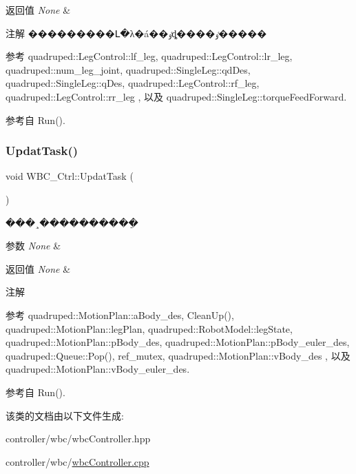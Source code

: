 \begin{DoxyRetVals}{返回值}
{\em None} & \\
\hline
\end{DoxyRetVals}
\begin{DoxyNote}{注解}
���������Լ�λ�á��ٶȡ����ٶ����� 
\end{DoxyNote}


参考 quadruped\+::\+Leg\+Control\+::lf\+\_\+leg, quadruped\+::\+Leg\+Control\+::lr\+\_\+leg, quadruped\+::num\+\_\+leg\+\_\+joint, quadruped\+::\+Single\+Leg\+::qd\+Des, quadruped\+::\+Single\+Leg\+::q\+Des, quadruped\+::\+Leg\+Control\+::rf\+\_\+leg, quadruped\+::\+Leg\+Control\+::rr\+\_\+leg , 以及 quadruped\+::\+Single\+Leg\+::torque\+Feed\+Forward.



参考自 Run().

\mbox{\label{classquadruped_1_1WBC__Ctrl_ac486930d16b7d44f10b86ad67ef76770}} 
\subsubsection{\texorpdfstring{Updat\+Task()}{UpdatTask()}}
{\footnotesize\ttfamily void W\+B\+C\+\_\+\+Ctrl\+::\+Updat\+Task (\begin{DoxyParamCaption}\item[{void}]{ }\end{DoxyParamCaption})}



���¸����������ֵ 


\begin{DoxyParams}{参数}
{\em None} & \\
\hline
\end{DoxyParams}

\begin{DoxyRetVals}{返回值}
{\em None} & \\
\hline
\end{DoxyRetVals}
\begin{DoxyNote}{注解}

\end{DoxyNote}


参考 quadruped\+::\+Motion\+Plan\+::a\+Body\+\_\+des, Clean\+Up(), quadruped\+::\+Motion\+Plan\+::leg\+Plan, quadruped\+::\+Robot\+Model\+::leg\+State, quadruped\+::\+Motion\+Plan\+::p\+Body\+\_\+des, quadruped\+::\+Motion\+Plan\+::p\+Body\+\_\+euler\+\_\+des, quadruped\+::\+Queue\+::\+Pop(), ref\+\_\+mutex, quadruped\+::\+Motion\+Plan\+::v\+Body\+\_\+des , 以及 quadruped\+::\+Motion\+Plan\+::v\+Body\+\_\+euler\+\_\+des.



参考自 Run().



该类的文档由以下文件生成\+:\begin{DoxyCompactItemize}
\item 
controller/wbc/wbc\+Controller.\+hpp\item 
controller/wbc/\hyperlink{wbcController_8cpp}{wbc\+Controller.\+cpp}\end{DoxyCompactItemize}
